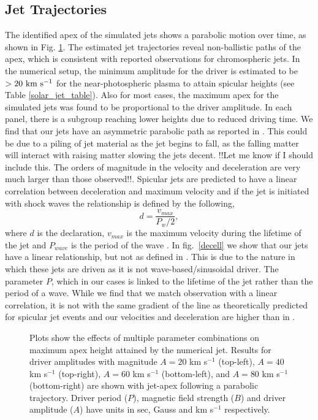 \documentclass[12pt]{ociamthesis}
\newcommand{\np}{\\ \\}
\begin{document}
\subsection{Jet Trajectories}
\label{subsec:jet_traj}
The identified apex of the simulated jets shows a parabolic motion over time, as shown in Fig. \ref{jet_traj}. The estimated jet trajectories reveal non-ballistic paths of the apex, which is consistent with reported observations \citep{Hansteen2006ApJ, Rouppe2007ApJ660L169R, Pontieu2007PASJ} for chromospheric jets. In the numerical setup, the minimum amplitude for the driver is estimated to be $>20 ~\rm{km ~s^{-1}}$ for the near-photospheric plasma to attain spicular heights (see Table \ref{solar_jet_table}). Also for most cases, the maximum apex for the simulated jets was found to be proportional to the driver amplitude. In each panel, there is a subgroup reaching lower heights due to reduced driving time. We find that our jets have an asymmetric parabolic path as reported in \cite{Singh2019}. This could be due to a piling of jet material as the jet begins to fall, as the falling matter will interact with raising matter slowing the jets decent.
%
{\color{green}!!Let me know if I should include this. The orders of magnitude in the velocity and deceleration are very much larger than those observed!!}. Spicular jets are predicted to have a linear correlation between deceleration and maximum velocity and if the jet is initiated with shock waves the relationship is defined by the following,
\begin{equation} \label{trend_heg}
d = \frac{v_{max}}{P_{w}/2},
\end{equation}
where $d$ is the declaration, $v_{max}$ is the maximum velocity during the lifetime of the jet and $P_{wave}$ is the period of the wave \citep{Heggland2007ApJ6661277H}. In fig.~\ref{decell} we show that our jets have a linear relationship, but not as defined in \cite{Heggland2007ApJ6661277H}. This is due to the nature in which these jets are driven as it is not wave-based/sinusoidal driver. The parameter $P$, which in our cases is linked to the lifetime of the jet rather than the period of a wave. While we find that we match observation with a linear correlation, it is not with the same gradient of the line as theoretically predicted for spicular jet events and our velocities and deceleration are higher than in \cite{Heggland2007ApJ6661277H}.   
\begin{figure}
\captionsetup[subfigure]{labelformat=empty}
\centering
{}
\caption{Plots show the effects of multiple parameter combinations on maximum apex height attained by the numerical jet. Results for driver amplitudes with magnitude $A = 20$ km s$^{-1}$ (top-left), $A = 40$ km s$^{-1}$ (top-right), $A = 60$ km s$^{-1}$ (bottom-left), and $A = 80$ km s$^{-1}$ (bottom-right) are shown with jet-apex following a parabolic trajectory. Driver period ($P$), magnetic field strength ($B$) and driver amplitude ($A$) have units in sec, Gauss and km s$^{-1}$ respectively.}
\label{jet_traj}
\end{figure}
\end{document}
